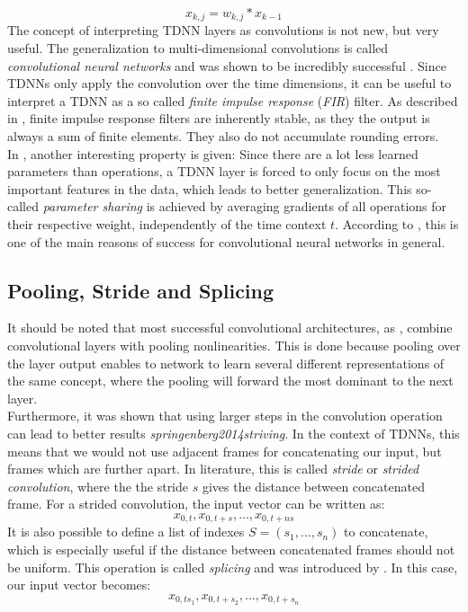\[
x_{k,j} = w_{k, j} * x_{k - 1}
\]
The concept of interpreting TDNN layers as convolutions is not new, but very useful. The generalization to multi-dimensional convolutions is called \textit{convolutional neural networks} and was shown to be incredibly successful \cite{krizhevsky2012imagenet}. Since TDNNs only apply the convolution over the time dimensions, it can be useful to interpret a TDNN as a so called \textit{finite impulse response} (\textit{FIR}) filter. As described in \cite{leon2015signale}, finite impulse response filters are inherently stable, as they the output is always a sum of finite elements. They also do not accumulate rounding errors. \\
In \cite{waibel1990phoneme}, another interesting property is given: Since there are a lot less learned parameters than operations, a TDNN layer is forced to only focus on the most important features in the data, which leads to better generalization. This so-called \textit{parameter sharing} is achieved by averaging gradients of all operations for their respective weight, independently of the time context $t$. According to \cite{Goodfellow-et-al-2016}, this is one of the main reasons of success for convolutional neural networks in general. 

\subsection{Pooling, Stride and Splicing}

It should be noted that most successful convolutional architectures, as \cite{krizhevsky2012imagenet}, combine convolutional layers with pooling nonlinearities. This is done because pooling over the layer output enables to network to learn several different representations of the same concept, where the pooling will forward the most dominant to the next layer. \\
Furthermore, it was shown that using larger steps in the convolution operation can lead to better results \textit{springenberg2014striving}. In the context of TDNNs, this means that we would not use adjacent frames for concatenating our input, but frames which are further apart. In literature, this is called \textit{stride} or \textit{strided convolution}, where the the stride $s$ gives the distance between concatenated frame. For a strided convolution, the input vector can be written as:
\[
x_{0,t}, x_{0,t + s}, ..., x_{0,t + ns}
\] 
It is also possible to define a list of indexes $S = (s_1, ..., s_n)$ to concatenate, which is especially useful if the distance between concatenated frames should not be uniform. This operation is called \textit{splicing} and was introduced by \cite{peddinti2015jhu}. In this case, our input vector becomes: 
\[
x_{0,ts_1}, x_{0,t + s_2}, ..., x_{0,t + s_n}
\] 

